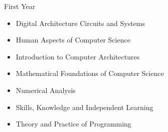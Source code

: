 \begin{entrylist}
{	{First Year}
	\begin{itemize}[topsep=0pt]
		\item Digital Architecture Circuits and Systems
		\item Human Aspects of Computer Science
		\item Introduction to Computer Architectures
		\item Mathematical Foundations of Computer Science
		\item Numerical Analysis
		\item Skills, Knowledge and Independent Learning
		\item Theory and Practice of Programming
	\end{itemize}
}
\end{entrylist}


